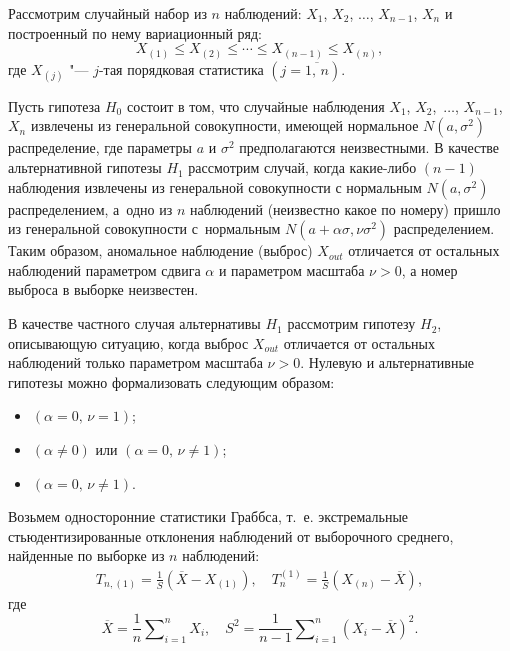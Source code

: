  \smallskip
 
 \hypertarget{shir:1}{}


Рассмотрим случайный набор из $n$  наблюдений: 
$X_1$, $X_2$, $\ldots$, $X_{n-1}$, $X_n$  и построенный по нему вариационный ряд:
$$X_{(1)}\le X_{(2)}\le \cdots\le X_{(n-1)}\le X_{(n)},$$  
где $X_{(j)}$ "--- $j$-тая порядковая статистика $(j=\overline{1,\,n})$.

Пусть гипотеза $H_0$ состоит в том, что случайные наблюдения
$X_1$, $X_2$,~$\ldots$, $X_{n-1}$, $X_n$ извлечены из генеральной совокупности, имеющей нормальное \linebreak $N(a,\sigma^2)$ распределение, где параметры $a$  и $\sigma^2$ предполагаются неизвестными.
В качестве  альтернативной гипотезы $H_1$ рассмотрим случай, когда
какие-либо $(n-1)$ наблюдения извлечены из генеральной совокупности с нормальным $N(a,\sigma^2)$ распределением, а~одно  из $n$ наблюдений (неизвестно какое по номеру) пришло из генеральной совокупности с~нормальным  $N(a+\alpha\sigma,\nu\sigma^2)$ распределением.
Таким образом, аномальное наблюдение (выброс)  $X_{out}$ отличается от остальных наблюдений   параметром сдвига $\alpha$ и параметром масштаба $\nu>0$, а  номер выброса в выборке  неизвестен.

В качестве  частного случая  альтернативы  $H_1$ рассмотрим гипотезу $H_2$, описывающую ситуацию, когда выброс  $X_{out}$ отличается от остальных наблюдений   только параметром масштаба $\nu>0$.
Нулевую и альтернативные гипотезы можно формализовать следующим образом: 
\begin{itemize}
\item[$H_0$:] $(\alpha=0,\,\nu=1)$;
\item[$H_1$:] $(\alpha\neq 0)$ или $(\alpha=0,\,\nu \neq 1)$;
\item[$H_2$:] $(\alpha=0,\,\nu \neq 1)$.
\end{itemize}

Возьмем односторонние статистики Граббса, т.~е. экстремальные стьюдентизированные отклонения наблюдений от выборочного среднего, найденные по выборке из $n$ наблюдений:
\begin{gather}
T_{n,(1)}= \frac 1S(\overline{X}-X_{(1)}),\quad
T_{n}^{(1)}=\frac 1S(X_{(n)}-\overline{X}),
\end{gather}
где 
$$\overline{X}=\frac{1}{n}\sum\nolimits_{i=1}^{n}X_{i}, \quad S^2=\frac{1}{n-1}\sum\nolimits_{i=1}^{n}(X_i-\overline{X})^2.$$

